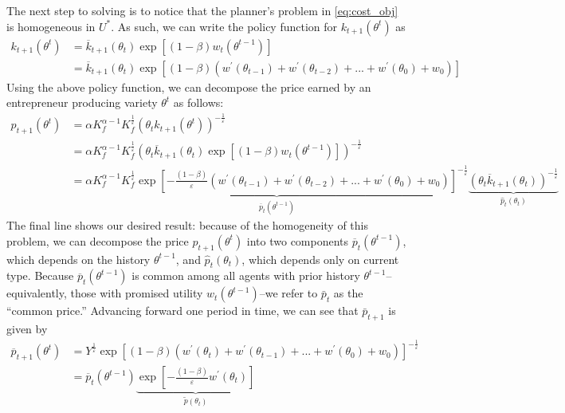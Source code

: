 \documentclass[11pt]{article}
\begin{document}
The next step to solving is to notice that the planner's problem in \eqref{eq:cost_obj} is homogeneous in \( U^* \). As such, we can write the policy function for \( k_{t+1}\left( \theta^t \right) \) as 
\begin{align*}
    k_{t+1}\left(\theta^{t}\right)&=\overline{k}_{t+1}\left(\theta_{t}\right)\exp\left[\left(1-\beta\right)w_{t}\left(\theta^{t-1}\right)\right]\\&=\overline{k}_{t+1}\left(\theta_{t}\right)\exp\left[\left(1-\beta\right)\left(w^{\prime}\left(\theta_{t-1}\right)+w^{\prime}\left(\theta_{t-2}\right)+...+w^{\prime}\left(\theta_{0}\right)+w_{0}\right)\right]
\end{align*}
Using the above policy function, we can decompose the price earned by an entrepreneur producing variety \( \theta^t \) as follows: 
\begin{align*}
    p_{t+1}\left(\theta^{t}\right)&=\alpha K_{f}^{\alpha-1}K_{f}^{\frac{1}{\varepsilon}}\left(\theta_{t}k_{t+1}\left(\theta^{t}\right)\right)^{-\frac{1}{\varepsilon}}\\&=\alpha K_{f}^{\alpha-1}K_{f}^{\frac{1}{\varepsilon}}\left(\theta_{t}\overline{k}_{t+1}\left(\theta_{t}\right)\exp\left[\left(1-\beta\right)w_{t}\left(\theta^{t-1}\right)\right]\right)^{-\frac{1}{\varepsilon}}\\&=\underbrace{\alpha K_{f}^{\alpha-1}K_{f}^{\frac{1}{\varepsilon}}\exp\left[-\frac{\left(1-\beta\right)}{\varepsilon}\left(w^{\prime}\left(\theta_{t-1}\right)+w^{\prime}\left(\theta_{t-2}\right)+...+w^{\prime}\left(\theta_{0}\right)+w_{0}\right)\right]^{-\frac{1}{\varepsilon}}}_{\overline{p}_{t}\left(\theta^{t-1}\right)}\underbrace{\left(\theta_{t}\overline{k}_{t+1}\left(\theta_{t}\right)\right)^{-\frac{1}{\varepsilon}}}_{\hat{p}_{t}\left(\theta_{t}\right)}
\end{align*}
The final line shows our desired result: because of the homogeneity of this problem, we can decompose the price \( p_{t+1}\left(\theta^{t}\right) \) into two components \( \overline{p}_{t}\left(\theta^{t-1}\right) \), which depends on the history \( \theta^{t-1} \), and \( \hat{p}_t\left( \theta_t \right) \), which depends only on current type. Because \( \overline{p}_{t}\left(\theta^{t-1}\right) \) is common among all agents with prior history \( \theta^{t-1} \)--equivalently, those with promised utility \( w_t\left( \theta^{t-1} \right) \)--we refer to \( \bar{p}_t \) as the ``common price.'' Advancing forward one period in time, we can see that \( \bar{p}_{t+1} \) is given by 
\begin{align*}
    \overline{p}_{t+1}\left(\theta^{t}\right)&=Y^{\frac{1}{\varepsilon}}\exp\left[\left(1-\beta\right)\left(w^{\prime}\left(\theta_{t}\right)+w^{\prime}\left(\theta_{t-1}\right)+...+w^{\prime}\left(\theta_{0}\right)+w_{0}\right)\right]^{-\frac{1}{\varepsilon}}\\&=\overline{p}_{t}\left(\theta^{t-1}\right)\underbrace{\exp\left[-\frac{\left(1-\beta\right)}{\varepsilon}w^{\prime}\left(\theta_{t}\right)\right]}_{\tilde{p}\left(\theta_{t}\right)}
\end{align*}
\end{document}
